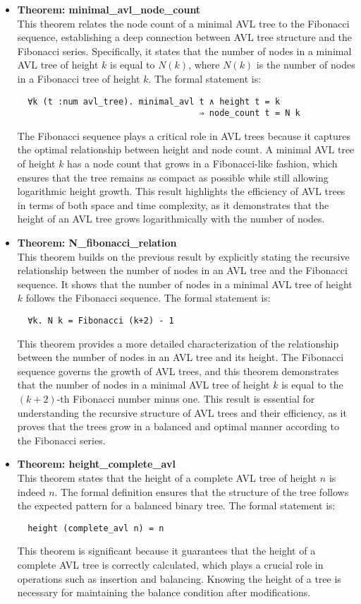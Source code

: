 \documentclass[12pt]{article}
\begin{document}
\begin{itemize}
  \item \textbf{Theorem: minimal\_avl\_node\_count} \\
  This theorem relates the node count of a minimal AVL tree to the Fibonacci sequence, establishing a deep connection between AVL tree structure and the Fibonacci series. Specifically, it states that the number of nodes in a minimal AVL tree of height \( k \) is equal to \( N(k) \), where \( N(k) \) is the number of nodes in a Fibonacci tree of height \( k \). The formal statement is:
  \begin{verbatim}
  ∀k (t :num avl_tree). minimal_avl t ∧ height t = k
                                    ⇒ node_count t = N k
  \end{verbatim}
  The Fibonacci sequence plays a critical role in AVL trees because it captures the optimal relationship between height and node count. A minimal AVL tree of height \( k \) has a node count that grows in a Fibonacci-like fashion, which ensures that the tree remains as compact as possible while still allowing logarithmic height growth. This result highlights the efficiency of AVL trees in terms of both space and time complexity, as it demonstrates that the height of an AVL tree grows logarithmically with the number of nodes.

  \item \textbf{Theorem: N\_fibonacci\_relation} \\
  This theorem builds on the previous result by explicitly stating the recursive relationship between the number of nodes in an AVL tree and the Fibonacci sequence. It shows that the number of nodes in a minimal AVL tree of height \( k \) follows the Fibonacci sequence. The formal statement is:
  \begin{verbatim}
  ∀k. N k = Fibonacci (k+2) - 1
  \end{verbatim}
  This theorem provides a more detailed characterization of the relationship between the number of nodes in an AVL tree and its height. The Fibonacci sequence governs the growth of AVL trees, and this theorem demonstrates that the number of nodes in a minimal AVL tree of height \( k \) is equal to the \( (k+2) \)-th Fibonacci number minus one. This result is essential for understanding the recursive structure of AVL trees and their efficiency, as it proves that the trees grow in a balanced and optimal manner according to the Fibonacci series.
  
  \item \textbf{Theorem: height\_complete\_avl} \\
  This theorem states that the height of a complete AVL tree of height \( n \) is indeed \( n \). The formal definition ensures that the structure of the tree follows the expected pattern for a balanced binary tree. The formal statement is:
  \begin{verbatim}
  height (complete_avl n) = n
  \end{verbatim}
  This theorem is significant because it guarantees that the height of a complete AVL tree is correctly calculated, which plays a crucial role in operations such as insertion and balancing. Knowing the height of a tree is necessary for maintaining the balance condition after modifications.


\end{itemize}
\end{document}

